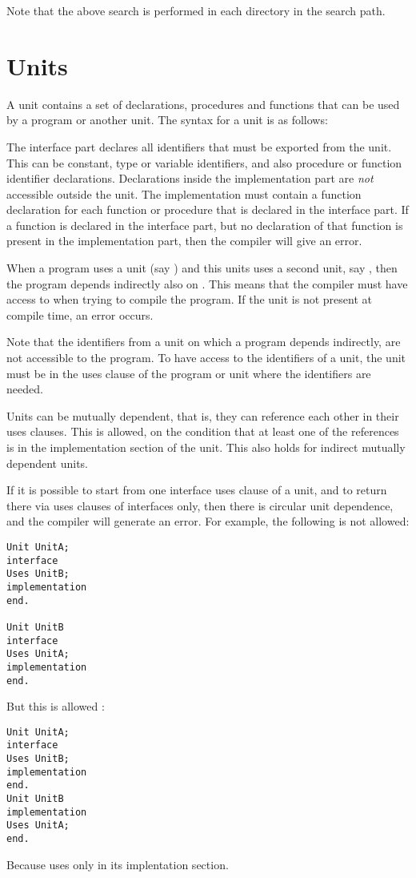 Note that the above search is performed in each directory in the search
path. 

\section{Units}
A unit contains a set of declarations, procedures and functions that can be
used by a program or another unit.
The syntax for a unit is as follows:

The interface part declares all identifiers that must be exported from the
unit. This can be constant, type or variable identifiers, and also procedure
or function identifier declarations. Declarations inside the
implementation part are {\em not} accessible outside the unit. The
implementation must contain a function declaration for each function or
procedure that is declared in the interface part. If a function is declared
in the interface part, but no declaration of that function is present in the
implementation part, then the compiler will give an error.

When a program uses a unit (say ) and this units uses a second
unit, say , then the program depends indirectly also on
. This means that the compiler must have access to  when
trying to compile the program. If the unit is not present at compile time,
an error occurs.

Note that the identifiers from a unit on which a program depends indirectly,
are not accessible to the program. To have access to the identifiers of a
unit, the unit must be in the uses clause of the program or unit where the
identifiers are needed.

Units can be mutually dependent, that is, they can reference each other in
their uses clauses. This is allowed, on the condition that at least one of
the references is in the implementation section of the unit. This also holds
for indirect mutually dependent units.

If it is possible to start from one interface uses clause of a unit, and to return
there via uses clauses of interfaces only, then there is circular unit
dependence, and the compiler will generate an error.
For example, the following is not allowed:
\begin{verbatim}
Unit UnitA;
interface
Uses UnitB;
implementation
end.

Unit UnitB
interface
Uses UnitA;
implementation
end.
\end{verbatim}
But this is allowed :
\begin{verbatim}
Unit UnitA;
interface
Uses UnitB;
implementation
end.
Unit UnitB
implementation
Uses UnitA;
end.
\end{verbatim}
Because  uses  only in its implentation section.

